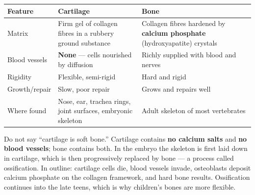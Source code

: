 \documentclass[11pt]{article}
\newcommand{\cle}[1]{{\popxbold\color{popdark}#1}}
\begin{document}
\begin{center}
\begin{tabularx}{\linewidth}{|l|X|X|}
\hline
\rowcolor{popblueL} \textbf{Feature} & \textbf{Cartilage} & \textbf{Bone} \\
\hline
Matrix & Firm gel of collagen fibres in a rubbery ground substance & Collagen fibres hardened by \textbf{calcium phosphate} (hydroxyapatite) crystals \\
\hline
Blood vessels & \textbf{None} --- cells nourished by diffusion & Richly supplied with blood and nerves \\
\hline
Rigidity & Flexible, semi-rigid & Hard and rigid \\
\hline
Growth/repair & Slow, poor repair & Grows and repairs well \\
\hline
Where found & Nose, ear, trachea rings, joint surfaces, embryonic skeleton & Adult skeleton of most vertebrates \\
\hline
\end{tabularx}
\end{center}

\begin{attention}
Do not say ``cartilage is soft bone.'' Cartilage contains \textbf{no calcium salts} and \textbf{no blood vessels}; bone contains both. In the embryo the skeleton is first laid down in cartilage, which is then progressively replaced by bone --- a process called \cle{ossification}. In outline: cartilage cells die, blood vessels invade, osteoblasts deposit calcium phosphate on the collagen framework, and hard bone results. Ossification continues into the late teens, which is why children's bones are more flexible.
\end{attention}
\end{document}
